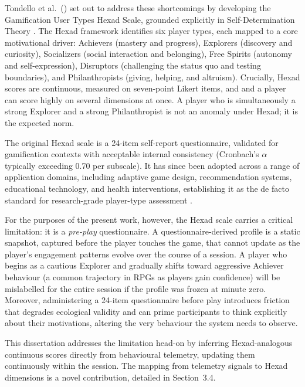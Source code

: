 Tondello et al.\ (\citeyear{tondello2016hexad}) set out to address these shortcomings by developing the Gamification User Types Hexad Scale, grounded explicitly in Self-Determination Theory \citep{ryan2000self}. The Hexad framework identifies six player types, each mapped to a core motivational driver: Achievers (mastery and progress), Explorers (discovery and curiosity), Socializers (social interaction and belonging), Free Spirits (autonomy and self-expression), Disruptors (challenging the status quo and testing boundaries), and Philanthropists (giving, helping, and altruism). Crucially, Hexad scores are continuous, measured on seven-point Likert items, and and a player can score highly on several dimensions at once. A player who is simultaneously a strong Explorer and a strong Philanthropist is not an anomaly under Hexad; it is the expected norm.

The original Hexad scale is a 24-item self-report questionnaire, validated for gamification contexts with acceptable internal consistency (Cronbach's $\alpha$ typically exceeding 0.70 per subscale). It has since been adopted across a range of application domains, including adaptive game design, recommendation systems, educational technology, and health interventions, establishing it as the de facto standard for research-grade player-type assessment \citep{hamari2014does}.

For the purposes of the present work, however, the Hexad scale carries a critical limitation: it is a \textit{pre-play} questionnaire. A questionnaire-derived profile is a static snapshot, captured before the player touches the game, that cannot update as the player's engagement patterns evolve over the course of a session. A player who begins as a cautious Explorer and gradually shifts toward aggressive Achiever behaviour (a common trajectory in RPGs as players gain confidence) will be mislabelled for the entire session if the profile was frozen at minute zero. Moreover, administering a 24-item questionnaire before play introduces friction that degrades ecological validity and can prime participants to think explicitly about their motivations, altering the very behaviour the system needs to observe.

This dissertation addresses the limitation head-on by inferring Hexad-analogous continuous scores directly from behavioural telemetry, updating them continuously within the session. The mapping from telemetry signals to Hexad dimensions is a novel contribution, detailed in Section~3.4.

